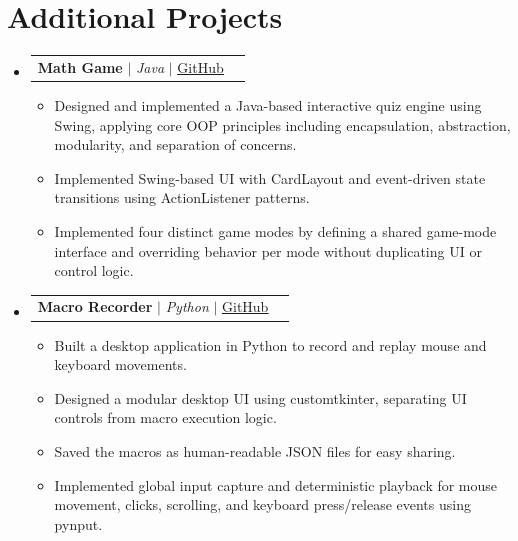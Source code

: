 \documentclass[letterpaper,11pt]{article}
\makeatletter
\newcommand{\resumeItem}[1]{
  \item\small{
    {#1 \vspace{-2pt}}
  }
}
\newcommand{\resumeProjectHeading}[2]{
    \item
    \begin{tabular*}{1.001\textwidth}{l@{\extracolsep{\fill}}r}
      \small#1 & \textbf{\small #2}\\
    \end{tabular*}\vspace{-7pt}
}
\newcommand{\resumeSubHeadingListStart}{\begin{itemize}[leftmargin=0.0in, label={}]}
\newcommand{\resumeSubHeadingListEnd}{\end{itemize}}
\newcommand{\resumeItemListStart}{\begin{itemize}}
\newcommand{\resumeItemListEnd}{\end{itemize}\vspace{-5pt}}
\makeatother
\begin{document}
\vspace{-16pt}

\section{Additional Projects}
\vspace{-5pt}
\resumeSubHeadingListStart

\resumeProjectHeading
{\textbf{Math Game} $|$ \emph{Java} $|$ {\upshape \uline{\href{https://github.com/nandth/kids-game-java}{GitHub}}}}{}
\resumeItemListStart
  \resumeItem{Designed and implemented a Java-based interactive quiz engine using Swing, applying core OOP principles including encapsulation, abstraction, modularity, and separation of concerns.}
  \resumeItem{Implemented Swing-based UI with CardLayout and event-driven state transitions using ActionListener patterns.}
  \resumeItem{Implemented four distinct game modes by defining a shared game-mode interface and overriding behavior per mode without duplicating UI or control logic.}
\resumeItemListEnd 
\vspace{-13pt}

\resumeProjectHeading
{\textbf{Macro Recorder} $|$ \emph{Python} $|$ {\upshape \uline{\href{https://github.com/nandth/macro-recorder}{GitHub}}}}{}
\resumeItemListStart
  \resumeItem{Built a desktop application in Python to record and replay mouse and keyboard movements.}
  \resumeItem{Designed a modular desktop UI using customtkinter, separating UI controls from macro execution logic.}
  \resumeItem{Saved the macros as human-readable JSON files for easy sharing.}
  \resumeItem{Implemented global input capture and deterministic playback for mouse movement, clicks, scrolling, and keyboard press/release events using pynput.}
\resumeItemListEnd 

\resumeSubHeadingListEnd
\vspace{-18pt}



%
\end{document}

